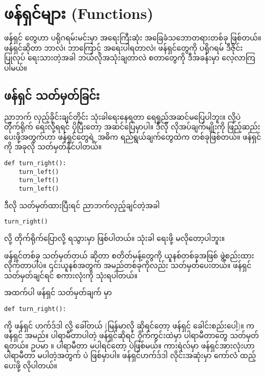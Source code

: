 \chapter{ဖန်ရှင်များ (Functions)}\label{ch:ch03}

ဖန်ရှင်  တွေဟာ ပရိုဂရမ်းမင်းမှာ အရေးကြီးဆုံး အခြေခံသဘောတရားတစ်ခု ဖြစ်တယ်။ ဖန်ရှင်ဆိုတာ ဘာလဲ၊ ဘာကြောင့် အရေးပါရတာလဲ၊ ဖန်ရှင်တွေကို ပရိုဂရမ် ဒီဇိုင်းပြုလုပ် ရေးသားတဲ့အခါ ဘယ်လိုအသုံးချတာလဲ စတာတွေကို ဒီအခန်းမှာ လေ့လာကြပါမယ်။

\section{ဖန်ရှင် သတ်မှတ်ခြင်း}
ညာဘက် လှည့်ခိုင်းချင်တိုင်း  သုံးခါရေးနေရတာ ရေရှည်အဆင်မပြေပါဘူး။  လို့ပဲ တိုက်ရိုက် ရေးလို့ရရင် ပိုပြီးတော့ အဆင်ပြေမှာပါ။ ဒီလို လိုအပ်ချက်မျိုးကို ဖြည့်ဆည်း ပေးဖို့အတွက်ဟာ ဖန်ရှင်တွေရဲ့ အဓိက ရည်ရွယ်ချက်တွေထဲက တစ်ခုဖြစ်တယ်။  ဖန်ရှင်ကို အခုလို သတ်မှတ်နိုင်ပါတယ်။
%
\setlength{\fboxsep}{0pt}
\begin{verbatim}
def turn_right():
    turn_left()
    turn_left()
    turn_left()
\end{verbatim}
%
ဒီလို သတ်မှတ်ထားပြီးရင် ညာဘက်လှည့်ချင်တဲ့အခါ 
%
\setlength{\fboxsep}{0pt}
\begin{verbatim}
turn_right()
\end{verbatim}
%
လို့ တိုက်ရိုက်ပြောလို့ ရသွားမှာ ဖြစ်ပါတယ်။  သုံးခါ ရေးဖို့ မလိုတော့ပါဘူး။

ဖန်ရှင်တစ်ခု သတ်မှတ်တယ်  ဆိုတာ စတိတ်မန့်တွေကို ယူနစ်တစ်ခုအဖြစ် ဖွဲ့စည်းထားလိုက်တာပါပဲ။ ၎င်းယူနစ်အတွက် အမည်တစ်ခုကိုလည်း သတ်မှတ်ပေးတယ်။  ဖန်ရှင် သတ်မှတ်ချင်ရင်  စကားလုံးကို သုံးရပါတယ်။ 

အထက်ပါ  ဖန်ရှင် သတ်မှတ်ချက်  မှာ 
%
\setlength{\fboxsep}{0pt}
\begin{verbatim}
def turn_right():
\end{verbatim}
%
ကို ဖန်ရှင် ဟက်ဒ်ဒါ  လို့ ခေါ်တယ် (မြန်မာလို ဆိုရင်တော့ ဖန်ရှင် ခေါင်းစည်းပေါ့)။  က ဖန်ရှင် အမည်။ ပါရာမီတာပါတဲ့ ဖန်ရှင်ဆိုရင် ဝိုက်ကွင်းထဲမှာ ပါရာမီတာတွေ သတ်မှတ်ရတယ်။ ဥပမာ ။ ပါရာမီတာ မပါရင်တော့ \fEn{\fCode{()}} ပဲဖြစ်မယ်။ ကားရဲလ်မှာ ဖန်ရှင်အားလုံးဟာ ပါရာမီတာ မပါတဲ့အတွက် \fEn{\fCode{()}} ပဲ ဖြစ်မှာပါ။ ဖန်ရှင်ဟက်ဒ်ဒါ လိုင်းအဆုံးမှာ ကော်လံ  ထည့်ပေးဖို့ လိုပါတယ်။ 


